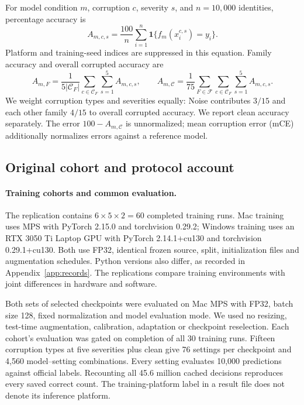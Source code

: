 \documentclass[twoside,a4paper,11pt]{article}
\begin{document}
For model condition $m$, corruption $c$, severity $s$, and $n=10{,}000$ identities, percentage accuracy is
\begin{equation}
A_{m,c,s}=\frac{100}{n}\sum_{i=1}^{n}\mathbf{1}\{f_m(x_i^{c,s})=y_i\}.
\end{equation}
Platform and training-seed indices are suppressed in this equation. Family accuracy and overall corrupted accuracy are
\begin{equation}
A_{m,F}=\frac{1}{5|\mathcal{C}_F|}\sum_{c\in\mathcal{C}_F}\sum_{s=1}^{5}A_{m,c,s},\qquad
A_{m,\mathcal C}=\frac1{75}\sum_{F\in\mathcal F}\sum_{c\in\mathcal C_F}\sum_{s=1}^{5}A_{m,c,s}.
\end{equation}
We weight corruption types and severities equally: Noise contributes $3/15$ and each other family $4/15$ to overall corrupted accuracy. We report clean accuracy separately. The error $100-A_{m,\mathcal C}$ is unnormalized; mean corruption error (mCE) additionally normalizes errors against a reference model.


\subsection{Original cohort and protocol account}
\paragraph{Training cohorts and common evaluation.}
\label{supp:cohortrecord}
The replication contains $6\times5\times2=60$ completed training runs. Mac training uses MPS with PyTorch 2.15.0 and torchvision 0.29.2; Windows training uses an RTX 3050 Ti Laptop GPU with PyTorch 2.14.1+cu130 and torchvision 0.29.1+cu130. Both use FP32, identical frozen source, split, initialization files and augmentation schedules. Python versions also differ, as recorded in Appendix~\ref{app:records}. The replications compare training environments with joint differences in hardware and software.

Both sets of selected checkpoints were evaluated on Mac MPS with FP32, batch size 128, fixed normalization and model evaluation mode. We used no resizing, test-time augmentation, calibration, adaptation or checkpoint reselection. Each cohort's evaluation was gated on completion of all 30 training runs. Fifteen corruption types at five severities plus clean give 76 settings per checkpoint and 4,560 model--setting combinations. Every setting evaluates 10,000 predictions against official labels. Recounting all 45.6 million cached decisions reproduces every saved correct count. The training-platform label in a result file does not denote its inference platform.
\end{document}
